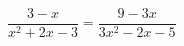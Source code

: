 \begin{ex}[type=equation]
	\begin{condition}
		$\dfrac{3 - x}{x^2 + 2x - 3} = \dfrac{9 - 3x}{3x^2 - 2x -5}$
	\end{condition}
\end{ex}